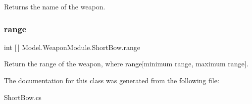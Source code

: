 Returns the name of the weapon. \hypertarget{class_model_1_1_weapon_module_1_1_short_bow_aa08fd974333e0b465cf712e4f4d25505}{}\label{class_model_1_1_weapon_module_1_1_short_bow_aa08fd974333e0b465cf712e4f4d25505} 
\subsubsection{\texorpdfstring{range}{range}}
{\footnotesize\ttfamily int \mbox{[}$\,$\mbox{]} Model.\+Weapon\+Module.\+Short\+Bow.\+range\hspace{0.3cm}{\ttfamily [get]}}

Return the range of the weapon, where range\mbox{[}minimum range, maximum range\mbox{]}. 

The documentation for this class was generated from the following file\+:\begin{DoxyCompactItemize}
\item 
Short\+Bow.\+cs\end{DoxyCompactItemize}
